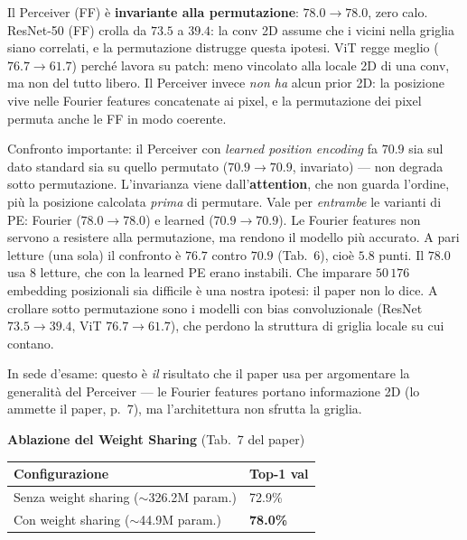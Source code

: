 \documentclass[
  11pt,
]{article}
\begin{document}
\begin{notabox}[title={\textbf{Argomento chiave del paper: permutation invariance}}]
Il Perceiver (FF) è \textbf{invariante alla permutazione}: $78.0 \to 78.0$, zero calo. ResNet-50 (FF) crolla da $73.5$ a $39.4$: la conv 2D assume che i vicini nella griglia siano correlati, e la permutazione distrugge questa ipotesi. ViT regge meglio ($76.7 \to 61.7$) perché lavora su patch: meno vincolato alla locale 2D di una conv, ma non del tutto libero. Il Perceiver invece \emph{non ha} alcun prior 2D: la posizione vive nelle Fourier features concatenate ai pixel, e la permutazione dei pixel permuta anche le FF in modo coerente.

Confronto importante: il Perceiver con \emph{learned position encoding} fa $70.9$ sia sul dato standard sia su quello permutato (\textbf{$70.9 \to 70.9$}, invariato) --- non degrada sotto permutazione. L'invarianza viene dall'\textbf{attention}, che non guarda l'ordine, più la posizione calcolata \emph{prima} di permutare. Vale per \emph{entrambe} le varianti di PE: Fourier ($78.0 \to 78.0$) e learned ($70.9 \to 70.9$). Le Fourier features non servono a resistere alla permutazione, ma rendono il modello più accurato. A pari letture (una sola) il confronto è $76.7$ contro $70.9$ (Tab.~6), cioè $5.8$ punti. Il $78.0$ usa 8 letture, che con la learned PE erano instabili. Che imparare $50\,176$ embedding posizionali sia difficile è una nostra ipotesi: il paper non lo dice. A crollare sotto permutazione sono i modelli con bias convoluzionale (ResNet $73.5 \to 39.4$, ViT $76.7 \to 61.7$), che perdono la struttura di griglia locale su cui contano.

In sede d'esame: questo è \emph{il} risultato che il paper usa per argomentare la generalità del Perceiver --- le Fourier features portano informazione 2D (lo ammette il paper, p.~7), ma l'architettura non sfrutta la griglia.
\end{notabox}

\textbf{Ablazione del Weight Sharing} (Tab.\ 7 del paper)

{\small
\begin{longtable}{@{}p{7cm} p{2.5cm}@{}}
\toprule
\textbf{Configurazione} & \textbf{Top-1 val} \\
\midrule
\endhead
Senza weight sharing ($\sim$326.2M param.) & 72.9\% \\[2pt]
Con weight sharing ($\sim$44.9M param.) & \textbf{78.0\%} \\
\bottomrule
\end{longtable}
}
\end{document}
